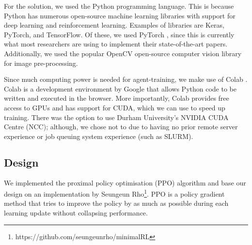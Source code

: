\documentclass[12pt,a4paper]{article}
\begin{document}
For the solution, we used the Python programming language. This is because Python has numerous open-source machine learning libraries with support for deep learning and reinforcement learning. Examples of libraries are Keras, PyTorch, and TensorFlow. Of these, we used PyTorch \cite{NEURIPS2019_9015}, since this is currently what most researchers are using to implement their state-of-the-art papers. Additionally, we used the popular OpenCV \cite{opencv_library} open-source computer vision library for image pre-processing.

Since much computing power is needed for agent-training, we make use of Colab \cite{Bisong2019}. Colab is a development environment by Google that allows Python code to be written and executed in the browser. More importantly, Colab provides free access to GPUs and has support for CUDA, which we can use to speed up training. There was the option to use Durham University's NVIDIA CUDA Centre (NCC); although, we chose not to due to having no prior remote server experience or job queuing system experience (such as SLURM).

\subsection{Design}
We implemented the proximal policy optimisation (PPO) algorithm \cite{DBLP:journals/corr/SchulmanWDRK17} and base our design on an implementation by Seungeun Rho\footnote{https://github.com/seungeunrho/minimalRL}. PPO is a policy gradient method that tries to improve the policy by as much as possible during each learning update without collapsing performance. 


\end{document}
